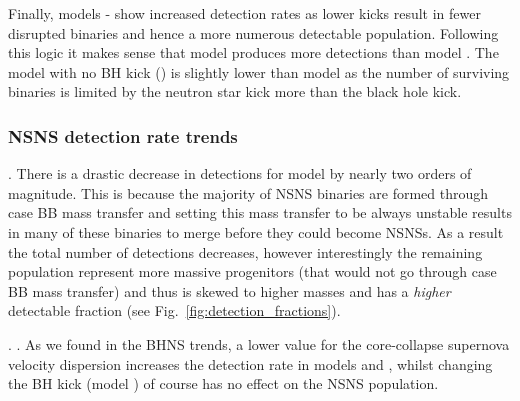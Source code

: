 Finally, models \modSigLow{}-\modNoBH{} show increased detection rates as lower kicks result in fewer disrupted binaries and hence a more numerous detectable population. Following this logic it makes sense that model \modSigLower{} produces more detections than model \modSigLow{}. The model with no BH kick (\modNoBH{}) is slightly lower than model \modSigLower{} as the number of surviving binaries is limited by the neutron star kick more than the black hole kick.

\subsubsection{NSNS detection rate trends}\label{sec:NSNS_detection_trends}

. There is a drastic decrease in detections for model \modCaseBB{} by nearly two orders of magnitude. This is because the majority of NSNS binaries are formed through case BB mass transfer and setting this mass transfer to be always unstable results in many of these binaries to merge before they could become NSNSs. As a result the total number of detections decreases, however interestingly the remaining population represent more massive progenitors (that would not go through case BB mass transfer) and thus is skewed to higher masses and has a \textit{higher} detectable fraction (see Fig.~\ref{fig:detection_fractions}).

. . As we found in the BHNS trends, a lower value for the core-collapse supernova velocity dispersion increases the detection rate in models \modSigLow{} and \modSigLower{}, whilst changing the BH kick (model \modNoBH{}) of course has no effect on the NSNS population.

